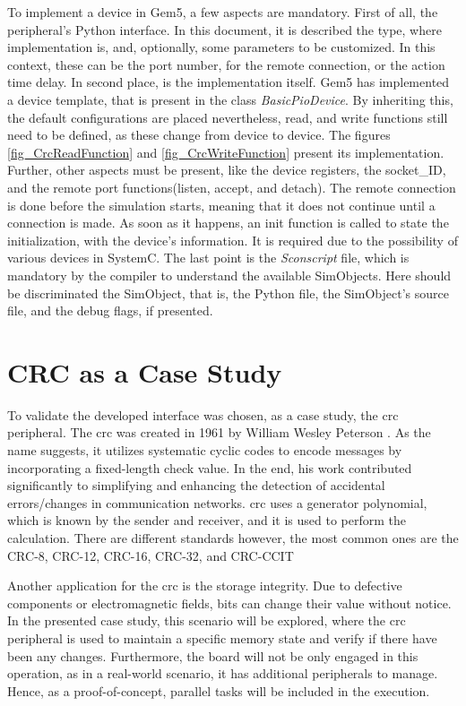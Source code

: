To implement a device in Gem5, a few aspects are mandatory. First of all, the peripheral's Python interface. In this document, it is 
described the type, where implementation is, and, optionally, some parameters to be customized. In this context, these can be
the port number, for the remote connection, or the action time delay. In second place, is the implementation itself. Gem5 has implemented 
a device template, that is present in the class \textit{BasicPioDevice}. By inheriting this, the default configurations are placed 
nevertheless, read, and write functions still need to be defined, as these change from device to device. The figures \ref{fig_CrcReadFunction} and \ref{fig_CrcWriteFunction}
present its implementation. Further, other aspects must be present, like the device registers, the socket\_ID, and the remote 
port functions(listen, accept, and detach). The remote connection is done before the simulation starts, meaning that it does not
continue until a connection is made. As soon as it happens, an init function is called to state the initialization, with the 
device's information. It is required due to the possibility of various devices in SystemC. The last point is the \textit{Sconscript} file, 
which is mandatory by the compiler to understand the available SimObjects. Here should be discriminated the SimObject, that is, 
the Python file, the SimObject's source file, and the debug flags, if presented.

\section{CRC as a Case Study}

To validate the developed interface was chosen, as a case study, the \gls{crc} peripheral. 
The \gls{crc} was created in 1961 by William Wesley Peterson \cite{peterson1961cyclic}. As the name suggests, 
it utilizes systematic cyclic codes to encode messages by incorporating a fixed-length check value. In the end, his work
contributed significantly to simplifying and enhancing the detection of accidental errors/changes in communication 
networks. \gls{crc} uses a generator polynomial, which is known by the sender and receiver, and it is used to 
perform the calculation. There are different standards however, the most common ones are the CRC-8, CRC-12, CRC-16, 
CRC-32, and CRC-CCIT \cite{borrelli2001ieee}

Another application for the \gls{crc} is the storage integrity. Due to defective components or electromagnetic fields,
bits can change their value without notice. In the presented case study, this scenario will be explored, where 
the \gls{crc} peripheral is used to maintain a specific memory state and verify if there have been any changes. 
Furthermore, the board will not be only engaged in this operation, as in a real-world scenario, it has additional peripherals to manage. 
Hence, as a proof-of-concept, parallel tasks will be included in the execution.

